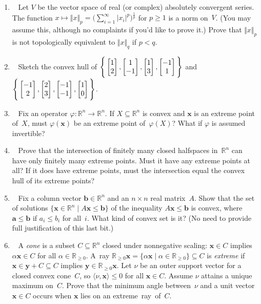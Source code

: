 \documentclass[11pt]{article}
\makeatletter
\newcommand\score[1]{\marginpar{\vspace{-2ex}\color{blue}{#1/3}}\hspace{-1ex}}
\newcommand\0{\mathbf{0}}
\newcommand\RR{\mathbb{R}}
\newcommand\bb{\mathbf{b}}
\newcommand\xx{\mathbf{x}}
\newcommand\yy{\mathbf{y}}
\newcommand\<{\langle}
\renewcommand\>{\rangle}
\renewcommand\aa{\mathbf{a}}
\newcommand\tworow[1]{\left[\begin{array}{@{}c@{}}#1\end{array}\right]}
\makeatother
\begin{document}
\begin{enumerate}
\item\ \score{}%
Let $V$ be the vector space of real (or complex) absolutely convergent
series.  The function $x \mapsto \Vert x \Vert_p =
\big(\sum_{i=1}^\infty |x_i|^p\big){}^{\frac 1p}$ for $p \geq 1$ is a
norm on~$V$.  (You may assume this, although no complaints if you'd
like to prove it.)  Prove that $\Vert x \Vert_p$ is not topologically
equivalent to $\Vert x \Vert_q$ if $p < q$.

\item\ \score{}%
Sketch the convex hull of
$\Bigg\{\tworow{1\\2},\tworow{1\\-1},\tworow{1\\3},\tworow{-1\\1}\Bigg\}$
and
$\Bigg\{\tworow{-1\\2},\tworow{2\\3},\tworow{-1\\-1},\tworow{1\\0}\Bigg\}$.

\item\ \score{}%
Fix an operator $\varphi : \RR^n \to \RR^n$.  If $X \subseteq \RR^n$
is convex and $\xx$ is an extreme point of~$X$, must $\varphi(\xx)$ be
an extreme point of~$\varphi(X)$?  What if $\varphi$ is assumed
invertible?

\item\ \score{}%
Prove that the intersection of finitely many closed halfspaces
in~$\RR^n$ can have only finitely many extreme points.  Must it have
any extreme points at all?  If it does have extreme points, must the
intersection equal the convex hull of its extreme points?

\item\ \score{}%
Fix a column vector $\bb\in\RR^n$ and an $n \times n$ real matrix~$A$.
Show that the set of solutions $\{\xx \in \RR^n \mid A\xx \leq \bb\}$
of the inequality $A\xx \leq \bb$ is convex, where $\aa \leq \bb$ if
$a_i \leq b_i$ for all~$i$.  What kind of convex set is it?  (No need
to provide full justification of this last bit.)

\item\ \score{}%
A \emph{cone} is a subset $C \subseteq \RR^n$ closed under nonnegative
scaling: $\xx \in C$ implies $\alpha \xx \in C$ for all $\alpha \in
\RR_{\geq 0}$.  A~ray $\RR_{\geq 0}\xx = \{\alpha\xx \mid \alpha \in
\RR_{\geq 0}\} \subseteq C$ is \emph{extreme} if $\xx \in \yy + C
\subseteq C$ implies $\yy \in \RR_{\geq 0}\xx$.  Let $\nu$ be an outer
support vector for a closed convex cone~$C$, so $\<\nu,\xx\> \leq 0$
for all $\xx \in C$.  Assume $\nu$ attains a unique maximum on~$C$.
Prove that the minimum angle between~$\nu$ and a unit vector~$\xx \in
C$ occurs when $\xx$ lies on an extreme~ray~of~$C$.


\end{enumerate}
\end{document}
